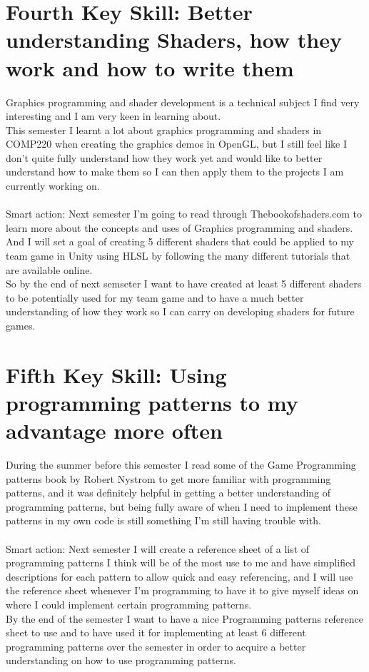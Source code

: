 \documentclass{scrartcl}
\begin{document}
\section{Fourth Key Skill: Better understanding Shaders, how they work and how to write them}
Graphics programming and shader development is a technical subject I find very interesting and I am very keen in learning about.
\\
This semester I learnt a lot about graphics programming and shaders in COMP220 when creating the graphics demos in OpenGL, but I still feel like I don't quite fully understand how they work yet and would like to better understand how to make them so I can then apply them to the projects I am currently working on.
\\
\\
Smart action: Next semester I'm going to read through Thebookofshaders.com to learn more about the concepts and uses of Graphics programming and shaders. And I will set a goal of creating 5 different shaders that could be applied to my team game in Unity using HLSL by following the many different tutorials that are available online.
\\
So by the end of next semseter I want to have created at least 5 different shaders to be potentially used for my team game and to have a much better understanding of how they work so I can carry on developing shaders for future games.
\section{Fifth Key Skill: Using programming patterns to my advantage more often}
During the summer before this semester I read some of the Game Programming patterns book by Robert Nystrom to get more familiar with programming patterns, and it was definitely helpful in getting a better understanding of programming patterns, but being fully aware of when I need to implement these patterns in my own code is still something I'm still having trouble with.
\\
\\
Smart action: Next semester I will create a reference sheet of a list of programming patterns I think will be of the most use to me and have simplified descriptions for each pattern to allow quick and easy referencing, and I will use the reference sheet whenever I'm programming to have it to give myself ideas on where I could implement certain programming patterns.
\\
By the end of the semester I want to have a nice Programming patterns reference sheet to use and to have used it for implementing at least 6 different programming patterns over the semester in order to acquire a better understanding on how to use programming patterns.
\end{document}
